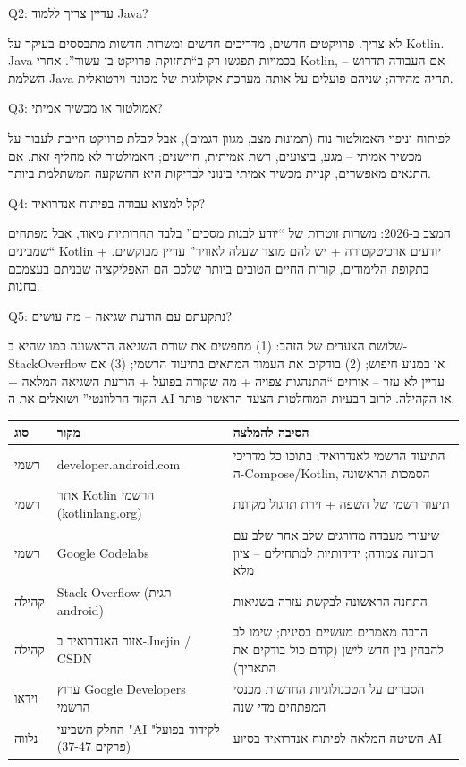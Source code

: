 Q2: עדיין צריך ללמוד Java?

לא צריך. פרויקטים חדשים, מדריכים חדשים ומשרות חדשות מתבססים בעיקר על Kotlin. Java בכמויות תפגשו רק ב“תחזוקת פרויקט בן עשור”. אחרי Kotlin, אם העבודה תדרוש – השלמת Java תהיה מהירה; שניהם פועלים על אותה מערכת אקולוגית של מכונה וירטואלית.

Q3: אמולטור או מכשיר אמיתי?

לפיתוח וניפוי האמולטור נוח (תמונות מצב, מגוון דגמים), אבל קבלת פרויקט חייבת לעבור על מכשיר אמיתי – מגע, ביצועים, רשת אמיתית, חיישנים; האמולטור לא מחליף זאת. אם התנאים מאפשרים, קניית מכשיר אמיתי בינוני לבדיקות היא ההשקעה המשתלמת ביותר.

Q4: קל למצוא עבודה בפיתוח אנדרואיד?

המצב ב-2026: משרות זוטרות של “יודע לבנות מסכים” בלבד תחרותיות מאוד, אבל מפתחים “שמבינים Kotlin + יודעים ארכיטקטורה + יש להם מוצר שעלה לאוויר” עדיין מבוקשים. בתקופת הלימודים, קורות החיים הטובים ביותר שלכם הם האפליקציה שבניתם בעצמכם בחנות.

Q5: נתקעתם עם הודעת שגיאה – מה עושים?

שלושת הצעדים של הזהב: (1) מחפשים את שורת השגיאה הראשונה כמו שהיא ב-StackOverflow או במנוע חיפוש; (2) בודקים את העמוד המתאים בתיעוד הרשמי; (3) אם עדיין לא עזר – אורזים “התנהגות צפויה + מה שקורה בפועל + הודעת השגיאה המלאה + הקוד הרלוונטי” ושואלים את ה-AI או הקהילה. לרוב הבעיות המוחלטות הצעד הראשון פותר.


\begin{center}
\begin{tabularx}{\linewidth}{|X|X|X|}
\hline
\textbf{סוג} & \textbf{מקור} & \textbf{הסיבה להמלצה} \tabularnewline
\hline
רשמי & developer.android.com & התיעוד הרשמי לאנדרואיד; בתוכו כל מדריכי ה-Compose/Kotlin, הסמכות הראשונה \tabularnewline
רשמי & אתר Kotlin הרשמי (kotlinlang.org) & תיעוד רשמי של השפה + זירת תרגול מקוונת \tabularnewline
רשמי & Google Codelabs & שיעורי מעבדה מדורגים שלב אחר שלב עם הכוונה צמודה; ידידותיות למתחילים – ציון מלא \tabularnewline
קהילה & Stack Overflow (תגית android) & התחנה הראשונה לבקשת עזרה בשגיאות \tabularnewline
קהילה & אזור האנדרואיד ב-Juejin / CSDN & הרבה מאמרים מעשיים בסינית; שימו לב להבחין בין חדש לישן (קודם כול בודקים את התאריך) \tabularnewline
וידאו & ערוץ Google Developers הרשמי & הסברים על הטכנולוגיות החדשות מכנסי המפתחים מדי שנה \tabularnewline
נלווה & החלק השביעי "AI לקידוד בפועל" (פרקים 37-47) & השיטה המלאה לפיתוח אנדרואיד בסיוע AI \tabularnewline
\hline
\end{tabularx}
\end{center}

